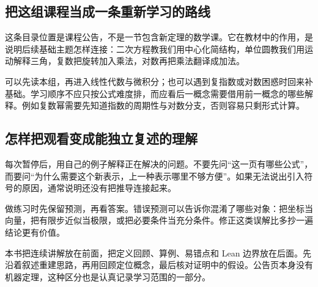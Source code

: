 \subsection*{把这组课程当成一条重新学习的路线}
这条目录位置是课程公告，不是一节包含新定理的数学课。它在教材中的作用，是说明后续基础主题怎样连接：二次方程教我们用中心化简结构，单位圆教我们用运动解释三角，复数把旋转加入乘法，对数再把乘法翻译成加法。

可以先读本组，再进入线性代数与微积分；也可以遇到复指数或对数困惑时回来补基础。学习顺序不应只按公式难度排，而应看后一概念需要借用前一概念的哪些解释。例如复数幂需要先知道指数的周期性与对数分支，否则容易只剩形式计算。

\subsection*{怎样把观看变成能独立复述的理解}
每次暂停后，用自己的例子解释正在解决的问题。不要先问“这一页有哪些公式”，而要问“为什么需要这个新表示，上一种表示哪里不够方便”。如果无法说出引入符号的原因，通常说明还没有把推导连接起来。

做练习时先保留预测，再看答案。错误预测可以告诉你混淆了哪些对象：把坐标当向量，把有限步近似当极限，或把必要条件当充分条件。修正这类误解比多抄一遍结论更有价值。

本书把连续讲解放在前面，把定义回顾、算例、易错点和 Lean 边界放在后面。先沿着叙述重建思路，再用回顾定位概念，最后核对证明中的假设。公告页本身没有机器定理，这种区分也是认真记录学习范围的一部分。

